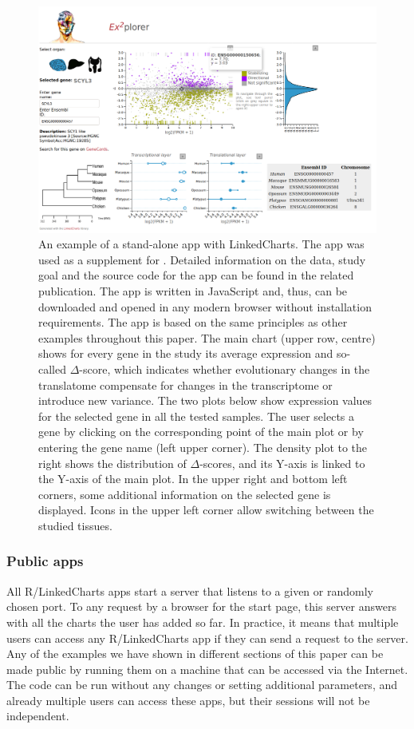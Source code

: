 \documentclass[twocolumn,10pt]{article}
\begin{document}
\begin{figure}[t]
   \includegraphics[width=\textwidth]{FigF/figF.png}
   \caption{An example of a stand-alone app with LinkedCharts. The app was used as a supplement for \cite{wang_2020}. Detailed information on the data, study goal and the source code for the app can be found in the related publication. The app is written in JavaScript and, thus, can be downloaded and opened in any modern browser without installation requirements. The app is based on the same principles as other examples throughout this paper. The main chart (upper row, centre) shows for every gene in the study its average expression and so-called $\Delta$-score, which indicates whether evolutionary changes in the translatome compensate for changes in the transcriptome or introduce new variance. The two plots below show expression values for the selected gene in all the tested samples. The user selects a gene by clicking on the corresponding point of the main plot or by entering the gene name (left upper corner). The density plot to the right shows the distribution of $\Delta$-scores, and its Y-axis is linked to the Y-axis of the main plot. In the upper right and bottom left corners, some additional information on the selected gene is displayed. Icons in the upper left corner allow switching between the studied tissues.}
   \label{FigF}
\end{figure}

\subsubsection{Public apps}

All R/LinkedCharts apps start a server that listens to a given or randomly chosen port. To any request by a browser for the start page, this server answers with all the charts the user has added so far. In practice, it means that multiple users can access any R/LinkedCharts app if they can send a request to the server. Any of the examples we have shown in different sections of this paper can be made public by running them on a machine that can be accessed via the Internet. The code can be run without any changes or setting additional parameters, and already multiple users can access these apps, but their sessions will not be independent.
\end{document}
